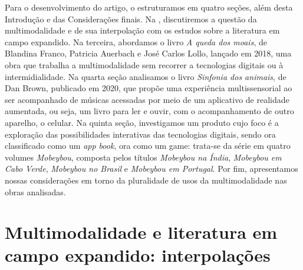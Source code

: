 \documentclass[portuguese]{textolivre}
\begin{document}
Para o desenvolvimento do artigo, o estruturamos em quatro seções, além desta
Introdução e das Considerações finais. Na , discutiremos a
questão da multimodalidade e de sua interpolação com os estudos sobre a
literatura em campo expandido. Na terceira, abordamos o livro \textit{A queda dos
moais}, de Blandina Franco, Patricia Auerbach e José Carlos Lollo, lançado em
2018, uma obra que trabalha a multimodalidade sem recorrer a tecnologias
digitais ou à intermidialidade. Na quarta seção analisamos o livro \textit{Sinfonia dos
animais}, de Dan Brown, publicado em 2020, que propõe uma experiência
multissensorial ao ser acompanhado de músicas acessadas por meio de um
aplicativo de realidade aumentada, ou seja, um livro para ler e ouvir, com o
acompanhamento de outro aparelho, o celular. Na quinta seção, investigamos um
produto cujo foco é a exploração das possibilidades interativas das tecnologias
digitais, sendo ora classificado como um \textit{app book}, ora como um game: trata-se
da série em quatro volumes \textit{Mobeybou}, composta pelos títulos \textit{Mobeybou na Índia},
\textit{Mobeybou em Cabo Verde}, \textit{Mobeybou no Brasil} e \textit{Mobeybou em Portugal}. Por fim,
apresentamos nossas considerações em torno da pluralidade de usos da
multimodalidade nas obras analisadas.

\section{Multimodalidade e literatura em campo expandido: interpolações}\label{sec-normas}
\end{document}
